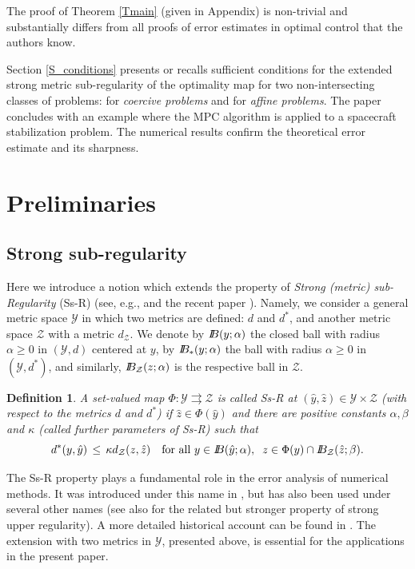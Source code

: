 \documentclass[11pt]{article}
\newtheorem{definition}[theo]{Definition}
\newcommand{\bd}{\begin{displaymath}}
\newcommand{\ed}{\end{displaymath}}
\newcommand{\B}{I\kern -.35em B}
\newcommand{\al}{\alpha}
\newcommand{\Y}{\mathcal Y}
\newcommand{\Z}{\mathcal Z}
\newcommand{\To}{\rightrightarrows }
\begin{document}
The proof of  Theorem \ref{Tmain} (given in Appendix) is non-trivial and substantially differs from all proofs 
of error estimates in optimal control that the authors know.

Section \ref{S_conditions} presents or recalls sufficient conditions for the extended strong metric sub-regularity 
of the optimality map for two non-intersecting classes of problems: for {\em coercive problems} and for {\em affine problems}.
The paper concludes with an example where the MPC algorithm is applied to a spacecraft stabilization problem.
The numerical results confirm the theoretical error estimate and its sharpness.  

\section{Preliminaries} \label{SPrelim}

\subsection{Strong sub-regularity} \label{SS_SsR}

Here we introduce a notion which extends the property of  
{\em Strong (metric) sub-Regularity} (Ss-R)  (see, e.g., \cite[Chapter 3.9 ]{AD+TR-book2}
and the recent paper \cite{Cibulka+Dontchev+Kruger-18}). 
Namely, we consider a general metric space $\Y$ in which two metrics are defined: $d$ and $d^*$, and another metric space
$\Z$ with a metric $d_\Z$. We denote by $\B(y;\al)$ the closed ball with radius $\al \geq 0$ in $(\Y,d)$ centered at $y$,
by $\B_*(y;\al)$ the ball with radius $\al \geq 0$ in $(\Y,d^*)$, and similarly, $\B_\Z(z;\al)$ is the respective ball in $\Z$.

\begin{definition} \label{DSMsR}
A set-valued map $\Phi : \Y \To \Z$ 
is called Ss-R at $(\hat y, \hat z) \in \Y \times \Z$ (with respect to the metrics $d$ and $d^*$) 
if $\hat z \in \Phi(\hat y)$ and there are positive constants $\alpha,\beta$  and $\kappa$ 
(called further parameters of Ss-R) such that 
\bd
    d^*(y,\hat y) \, \leq \, \kappa d_\Z(z, \hat z) \quad \mbox{for all } y \in \B(\hat y;\al), \;\; z \in \Phi(y)\cap \B_\Z(\hat z;\beta).
\ed
\end{definition}

The Ss-R property plays a fundamental role in the error analysis of numerical methods. 
It was introduced under this name in \cite{AD+TR-04}, but has also been used under several other names
(see also \cite[Chapter~1]{Klatte+Kummer-2002-book} for the related but stronger property of strong upper regularity). 
A more detailed historical account can be found in \cite[Section 1]{Cibulka+Dontchev+Kruger-18}. 
The extension with two metrics in $\Y$, presented above, is essential for the applications in the present paper.
\end{document}
